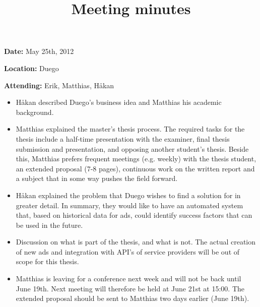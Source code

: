 \documentclass[a4paper]{article}
\begin{document}
\title{Meeting minutes}
\maketitle

\textbf{Date:} May 25th, 2012

\textbf{Location:} Duego

\textbf{Attending:} Erik, Matthias, Håkan

\begin{itemize}
	\item Håkan described Duego’s business idea and Matthias his academic background.
    \item Matthias explained the master’s thesis process. The required tasks for the thesis include a half-time presentation with the examiner, final thesis submission and presentation, and opposing another student’s thesis. Beside this, Matthias prefers frequent meetings (e.g. weekly) with the thesis student, an extended proposal (7-8 pages), continuous work on the written report and a subject that in some way pushes the field forward.
    \item Håkan explained the problem that Duego wishes to find a solution for in greater detail. In summary, they would like to have an automated system that, based on historical data for ads, could identify success factors that can be used in the future.
    \item Discussion on what is part of the thesis, and what is not. The actual creation of new ads and integration with API’s of service providers will be out of scope for this thesis.
    \item Matthias is leaving for a conference next week and will not be back until June 19th. Next meeting will therefore be held at June 21st at 15:00. The extended proposal should be sent to Matthias two days earlier (June 19th).
\end{itemize}

 
\end{document}
